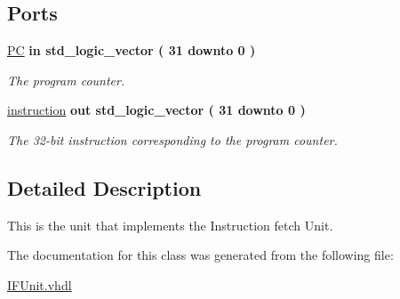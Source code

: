 \subsection*{Ports}
 \begin{DoxyCompactItemize}
\item 
\hypertarget{class_i_f_unit_a15b73a10b7d4cf16cdae7729404b05da}{\hyperlink{class_i_f_unit_a15b73a10b7d4cf16cdae7729404b05da}{P\-C}  {\bfseries {\bfseries \textcolor{vhdlkeyword}{in}\textcolor{vhdlchar}{ }}} {\bfseries \textcolor{comment}{std\-\_\-logic\-\_\-vector}\textcolor{vhdlchar}{ }\textcolor{vhdlchar}{(}\textcolor{vhdlchar}{ } \textcolor{vhdldigit}{31} \textcolor{vhdlchar}{ }\textcolor{vhdlchar}{ }\textcolor{vhdlchar}{ }\textcolor{vhdlkeyword}{downto}\textcolor{vhdlchar}{ }\textcolor{vhdlchar}{ }\textcolor{vhdlchar}{ } \textcolor{vhdldigit}{0} \textcolor{vhdlchar}{ }\textcolor{vhdlchar}{)}\textcolor{vhdlchar}{ }} }\label{class_i_f_unit_a15b73a10b7d4cf16cdae7729404b05da}

\begin{DoxyCompactList}\small\item\em The program counter. \end{DoxyCompactList}\item 
\hypertarget{class_i_f_unit_a7282477cc05fbd309237c0768127f042}{\hyperlink{class_i_f_unit_a7282477cc05fbd309237c0768127f042}{instruction}  {\bfseries {\bfseries \textcolor{vhdlkeyword}{out}\textcolor{vhdlchar}{ }}} {\bfseries \textcolor{comment}{std\-\_\-logic\-\_\-vector}\textcolor{vhdlchar}{ }\textcolor{vhdlchar}{(}\textcolor{vhdlchar}{ } \textcolor{vhdldigit}{31} \textcolor{vhdlchar}{ }\textcolor{vhdlchar}{ }\textcolor{vhdlchar}{ }\textcolor{vhdlkeyword}{downto}\textcolor{vhdlchar}{ }\textcolor{vhdlchar}{ }\textcolor{vhdlchar}{ } \textcolor{vhdldigit}{0} \textcolor{vhdlchar}{ }\textcolor{vhdlchar}{)}\textcolor{vhdlchar}{ }} }\label{class_i_f_unit_a7282477cc05fbd309237c0768127f042}

\begin{DoxyCompactList}\small\item\em The 32-\/bit instruction corresponding to the program counter. \end{DoxyCompactList}\end{DoxyCompactItemize}


\subsection{Detailed Description}
This is the unit that implements the Instruction fetch Unit. 

The documentation for this class was generated from the following file\-:\begin{DoxyCompactItemize}
\item 
\hyperlink{_i_f_unit_8vhdl}{I\-F\-Unit.\-vhdl}\end{DoxyCompactItemize}
